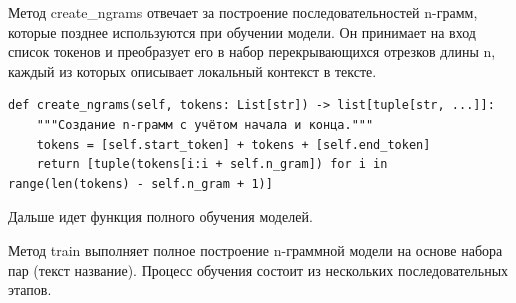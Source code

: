 \documentclass[coursework]{SCWorks}
\begin{document}
    Метод create\_ngrams отвечает за построение последовательностей n-грамм, которые позднее используются при обучении модели.
    Он принимает на вход список токенов и преобразует его в набор перекрывающихся отрезков длины {n},
    каждый из которых описывает локальный контекст в тексте.

    \begin{verbatim}
def create_ngrams(self, tokens: List[str]) -> list[tuple[str, ...]]:
    """Создание n-грамм с учётом начала и конца."""
    tokens = [self.start_token] + tokens + [self.end_token]
    return [tuple(tokens[i:i + self.n_gram]) for i in range(len(tokens) - self.n_gram + 1)]
    \end{verbatim}

    Дальше идет функция полного обучения моделей.

    Метод train выполняет полное построение n-граммной модели на основе набора пар (текст \to название).
    Процесс обучения состоит из нескольких последовательных этапов.
\end{document}

